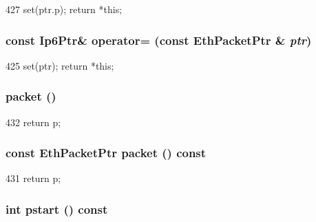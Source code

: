 \begin{DoxyCode}
427     { set(ptr.p); return *this; }
\end{DoxyCode}
\hypertarget{classNet_1_1Ip6Ptr_ac9f875b985f1f903a22efa555afe74e3}{
\subsubsection[{operator=}]{\setlength{\rightskip}{0pt plus 5cm}const {\bf Ip6Ptr}\& operator= (const {\bf EthPacketPtr} \& {\em ptr})}}
\label{classNet_1_1Ip6Ptr_ac9f875b985f1f903a22efa555afe74e3}



\begin{DoxyCode}
425     { set(ptr); return *this; }
\end{DoxyCode}
\hypertarget{classNet_1_1Ip6Ptr_a549ac5c293e8047f1be38ca356e160da}{
\subsubsection[{packet}]{ packet ()}}
\label{classNet_1_1Ip6Ptr_a549ac5c293e8047f1be38ca356e160da}



\begin{DoxyCode}
432 { return p; }
\end{DoxyCode}
\hypertarget{classNet_1_1Ip6Ptr_a13e32a6fa7b2f1b41d1d8dc32d8fda9e}{
\subsubsection[{packet}]{\setlength{\rightskip}{0pt plus 5cm}const {\bf EthPacketPtr} packet () const}}
\label{classNet_1_1Ip6Ptr_a13e32a6fa7b2f1b41d1d8dc32d8fda9e}



\begin{DoxyCode}
431 { return p; }
\end{DoxyCode}
\hypertarget{classNet_1_1Ip6Ptr_ae6fc8073bc02ff3fd03030e0936d56eb}{
\subsubsection[{pstart}]{\setlength{\rightskip}{0pt plus 5cm}int pstart () const}}
\label{classNet_1_1Ip6Ptr_ae6fc8073bc02ff3fd03030e0936d56eb}



